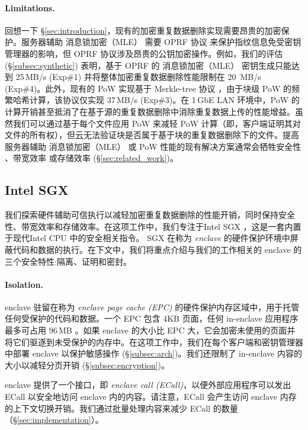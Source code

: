 \paragraph{Limitations.} 回想一下 \S\ref{sec:introduction}，现有的加密重复数据删除实现需要昂贵的加密保护。服务器辅助 消息锁加密（MLE） 需要 OPRF 协议 \cite{naor04} 来保护指纹信息免受密钥管理器的影响，但 OPRF 协议涉及昂贵的公钥加密操作。例如，我们的评估 (\S\ref{subsec:synthetic}) 表明，基于 OPRF 的 消息锁加密（MLE） 密钥生成只能达到 25\,MB/s (Exp\#1) 并将整体加密重复数据删除性能限制在 20 \,MB/s (Exp\#4)。此外，现有的 PoW 实现基于 Merkle-tree 协议 \cite{halevi11}，由于块级 PoW 的频繁哈希计算，该协议仅实现 37\,MB/s (Exp\#3)。在 1\,GbE LAN 环境中，PoW 的计算开销甚至抵消了在基于源的重复数据删除中消除重复数据上传的性能增益。虽然我们可以通过基于每个文件应用 PoW 来减轻 PoW 计算（即，客户端证明其对文件的所有权），但云无法验证块是否属于基于块的重复数据删除下的文件。提高服务器辅助 消息锁加密（MLE） 或 PoW 性能的现有解决方案通常会牺牲安全性 \cite{li20b,xu13,pietro12}、带宽效率 \cite{harnik10,li15} 或存储效率 \cite{zhou15,qin17,li20b} (\S\ref{sec:related_work})。

\subsection{Intel SGX}
\label{subsec:sgx} 

我们探索硬件辅助可信执行以减轻加密重复数据删除的性能开销，同时保持安全性、带宽效率和存储效率。在这项工作中，我们专注于Intel SGX \cite{sgx}，这是一套内置于现代Intel CPU 中的安全相关指令。 SGX 在称为 \textit{ enclave} 的硬件保护环境中屏蔽代码和数据的执行。在下文中，我们将重点介绍与我们的工作相关的 enclave 的三个安全特性:隔离、证明和密封。

\paragraph{Isolation.} enclave 驻留在称为 \textit{ enclave page cache (EPC)} 的硬件保护内存区域中，用于托管任何受保护的代码和数据。一个 EPC 包含 4KB 页面，任何 in-enclave 应用程序最多可占用 96\,MB \cite{harnik18}。如果 enclave 的大小比 EPC 大，它会加密未使用的页面并将它们驱逐到未受保护的内存中。在这项工作中，我们在每个客户端和密钥管理器中部署 enclave 以保护敏感操作 (\S\ref{subsec:arch})。我们还限制了 in-enclave 内容的大小以减轻分页开销 (\S\ref{subsec:encryption})。

enclave 提供了一个接口，即 \textit{ enclave call (ECall)}，以便外部应用程序可以发出 ECall 以安全地访问 enclave 内的内容。请注意，ECall 会产生访问 enclave 内存 \cite{harnik18} 的上下文切换开销。我们通过批量处理内容来减少 ECall 的数量（\S\ref{sec:implementation}）。

